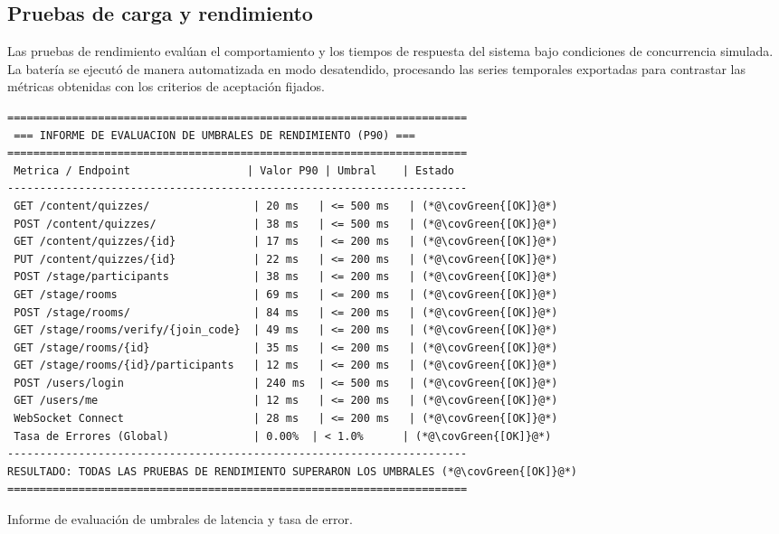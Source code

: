 \subsection{Pruebas de carga y rendimiento}\label{sub:resultados_pruebas_carga}

Las pruebas de rendimiento evalúan el comportamiento y los tiempos de respuesta del sistema bajo condiciones de concurrencia simulada. La batería se ejecutó de manera automatizada en modo desatendido, procesando las series temporales exportadas para contrastar las métricas obtenidas con los criterios de aceptación fijados.

\begin{evidence}[H]
\begin{lstlisting}
=======================================================================
 === INFORME DE EVALUACION DE UMBRALES DE RENDIMIENTO (P90) ===
=======================================================================
 Metrica / Endpoint                  | Valor P90 | Umbral    | Estado
-----------------------------------------------------------------------
 GET /content/quizzes/                | 20 ms   | <= 500 ms   | (*@\covGreen{[OK]}@*)
 POST /content/quizzes/               | 38 ms   | <= 500 ms   | (*@\covGreen{[OK]}@*)
 GET /content/quizzes/{id}            | 17 ms   | <= 200 ms   | (*@\covGreen{[OK]}@*)
 PUT /content/quizzes/{id}            | 22 ms   | <= 200 ms   | (*@\covGreen{[OK]}@*)
 POST /stage/participants             | 38 ms   | <= 200 ms   | (*@\covGreen{[OK]}@*)
 GET /stage/rooms                     | 69 ms   | <= 200 ms   | (*@\covGreen{[OK]}@*)
 POST /stage/rooms/                   | 84 ms   | <= 200 ms   | (*@\covGreen{[OK]}@*)
 GET /stage/rooms/verify/{join_code}  | 49 ms   | <= 200 ms   | (*@\covGreen{[OK]}@*)
 GET /stage/rooms/{id}                | 35 ms   | <= 200 ms   | (*@\covGreen{[OK]}@*)
 GET /stage/rooms/{id}/participants   | 12 ms   | <= 200 ms   | (*@\covGreen{[OK]}@*)
 POST /users/login                    | 240 ms  | <= 500 ms   | (*@\covGreen{[OK]}@*)
 GET /users/me                        | 12 ms   | <= 200 ms   | (*@\covGreen{[OK]}@*)
 WebSocket Connect                    | 28 ms   | <= 200 ms   | (*@\covGreen{[OK]}@*)
 Tasa de Errores (Global)             | 0.00%  | < 1.0%      | (*@\covGreen{[OK]}@*)
-----------------------------------------------------------------------
RESULTADO: TODAS LAS PRUEBAS DE RENDIMIENTO SUPERARON LOS UMBRALES (*@\covGreen{[OK]}@*)
=======================================================================
\end{lstlisting}
\caption{Informe de evaluación de umbrales de latencia y tasa de error.}
\label{ev:resumen_umbrales}
\end{evidence}

